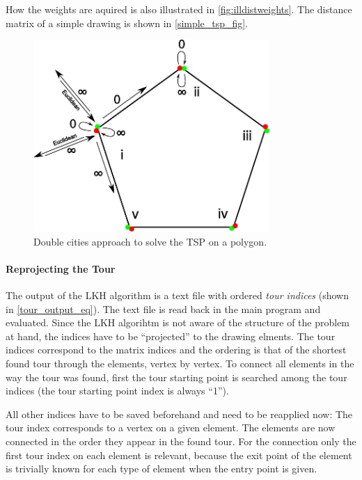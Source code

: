 How the weights are aquired is also illustrated in \autoref{fig:illdistweights}. The distance matrix of a simple drawing is shown in \autoref{simple_tsp_fig}.

\begin{figure}
\centering
\includegraphics[width=0.8\textwidth]{images/path_planning/double_cities.pdf}
\caption{Double cities approach to solve the TSP on a polygon.}\label{fig:doublecities}
\end{figure}

\paragraph{Reprojecting the Tour} The output of the LKH algorithm is a text file with ordered \textit{tour indices} (shown in \autoref{tour_output_eq}). The text file is read back in the main program and evaluated. Since the LKH algorihtm is not aware of the structure of the problem at hand, the indices have to be \enquote{projected} to the drawing elments. The tour indices correspond to the matrix indices and the ordering is that of the shortest found tour through the elements, vertex by vertex.
To connect all elements in the way the tour was found, first the tour starting point is searched among the tour indices (the tour starting point index is always \enquote{1}).

All other indices have to be saved beforehand and need to be reapplied now: The tour index corresponds to a vertex on a given element. The elements are now connected in the order they appear in the found tour. For the connection only the first tour index on each element is relevant, because the exit point of the element is trivially known for each type of element when the entry point is given.
 
